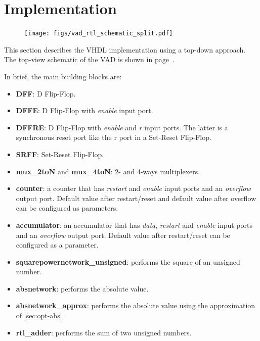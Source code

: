 \section{Implementation}

\begin{figure}
  \vspace*{-3.5cm}
  \hspace*{-3cm}
  \centering
  \texttt{[image: figs/vad\_rtl\_schematic\_split.pdf]}
  \label{fig:schematic_rtl}
\end{figure}

This section describes the VHDL implementation using a top-down approach. The
top-view schematic of the VAD is shown in page~\pageref{fig:schematic_rtl}.

In brief, the main building blocks are:
\begin{itemize}
  \item \textbf{DFF}: D Flip-Flop.
  \item \textbf{DFFE}: D Flip-Flop with \emph{enable} input port.
  \item \textbf{DFFRE}: D Flip-Flop with \emph{enable} and \emph{r} input ports.
    The latter is a synchronous reset port like the r port in a Set-Reset Flip-Flop.
  \item \textbf{SRFF}: Set-Reset Flip-Flop.
  \item \textbf{mux\_2toN} and \textbf{mux\_4toN}: 2- and 4-ways multiplexers.
  \item \textbf{counter}: a counter that has \emph{restart} and \emph{enable}
    input ports and an \emph{overflow} output port. Default value after restart/reset
    and default value after overflow can be configured as parameters.
  \item \textbf{accumulator}: an accumulator that has \emph{data}, \emph{restart} and \emph{enable}
    input ports and an \emph{overflow} output port. Default value after restart/reset
    can be configured as a parameter.
  \item \textbf{squarepowernetwork\_unsigned}: performs the square of an unsigned
    number.
  \item \textbf{absnetwork}: performs the absolute value.
  \item \textbf{absnetwork\_approx}: performs the absolute value using the approximation
    of \cref{sec:opt-abs}.
  \item \textbf{rtl\_adder}: performs the sum of two unsigned numbers.
\end{itemize}

